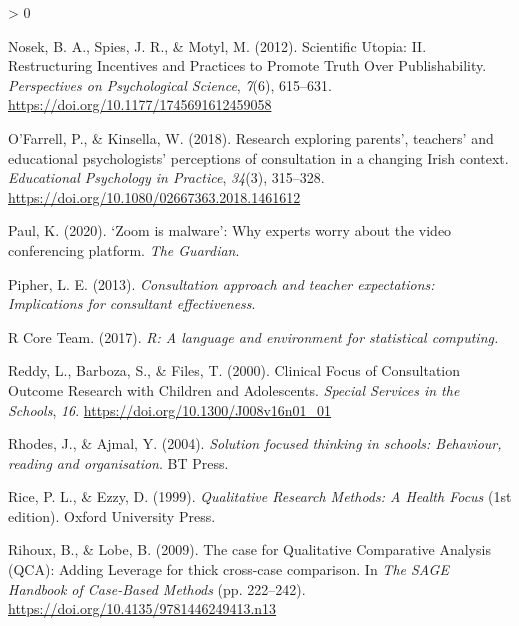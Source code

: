 \documentclass[
  english,
  man]{apa7}
\newlength{\cslhangindent}
\newenvironment{CSLReferences}[2] %
 {%
  \setlength{\parindent}{0pt}
  \ifodd #1 \everypar{\setlength{\hangindent}{\cslhangindent}}\ignorespaces\fi
  \ifnum #2 > 0
  \setlength{\parskip}{#2\baselineskip}
  \fi
 }%
 {}
\begin{document}
\begin{CSLReferences}{1}{0}
\leavevmode\hypertarget{ref-nosekScientificUtopiaII2012a}{}%
Nosek, B. A., Spies, J. R., \& Motyl, M. (2012). Scientific {Utopia}: {II}. {Restructuring Incentives} and {Practices} to {Promote Truth Over Publishability}. \emph{Perspectives on Psychological Science}, \emph{7}(6), 615--631. \url{https://doi.org/10.1177/1745691612459058}

\leavevmode\hypertarget{ref-ofarrellResearchExploringParents2018}{}%
O'Farrell, P., \& Kinsella, W. (2018). Research exploring parents', teachers' and educational psychologists' perceptions of consultation in a changing {Irish} context. \emph{Educational Psychology in Practice}, \emph{34}(3), 315--328. \url{https://doi.org/10.1080/02667363.2018.1461612}

\leavevmode\hypertarget{ref-paulZoomMalwareWhy2020}{}%
Paul, K. (2020). {`{Zoom} is malware'}: Why experts worry about the video conferencing platform. \emph{The Guardian}.

\leavevmode\hypertarget{ref-pipherConsultationApproachTeacher2013a}{}%
Pipher, L. E. (2013). \emph{Consultation approach and teacher expectations: {Implications} for consultant effectiveness}.

\leavevmode\hypertarget{ref-rcoreteamLanguageEnvironmentStatistical2017}{}%
R Core Team. (2017). \emph{R: {A} language and environment for statistical computing.}

\leavevmode\hypertarget{ref-reddyClinicalFocusConsultation2000}{}%
Reddy, L., Barboza, S., \& Files, T. (2000). Clinical {Focus} of {Consultation Outcome Research} with {Children} and {Adolescents}. \emph{Special Services in the Schools}, \emph{16}. \url{https://doi.org/10.1300/J008v16n01_01}

\leavevmode\hypertarget{ref-rhodesSolutionFocusedThinking2004a}{}%
Rhodes, J., \& Ajmal, Y. (2004). \emph{Solution focused thinking in schools: Behaviour, reading and organisation}. {BT Press}.

\leavevmode\hypertarget{ref-riceQualitativeResearchMethods1999}{}%
Rice, P. L., \& Ezzy, D. (1999). \emph{Qualitative {Research Methods}: {A Health Focus}} (1st edition). {Oxford University Press}.

\leavevmode\hypertarget{ref-rihouxCaseQualitativeComparative2009}{}%
Rihoux, B., \& Lobe, B. (2009). The case for {Qualitative Comparative Analysis} ({QCA}): {Adding Leverage} for thick cross-case comparison. In \emph{The {SAGE Handbook} of {Case}-{Based Methods}} (pp. 222--242). \url{https://doi.org/10.4135/9781446249413.n13}


\end{CSLReferences}
\end{document}

